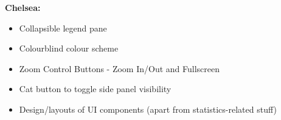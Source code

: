 \documentclass[../main.tex]{subfiles}
\begin{document}
\noindent \textbf{Chelsea:}{}
\begin{itemize}
    \itemsep0em 
    \item Collapsible legend pane
    \item Colourblind colour scheme
    \item Zoom Control Buttons - Zoom In/Out and Fullscreen
    \item Cat button to toggle side panel visibility
    \item Design/layouts of UI components (apart from statistics-related stuff)
\end{itemize}
\end{document}
